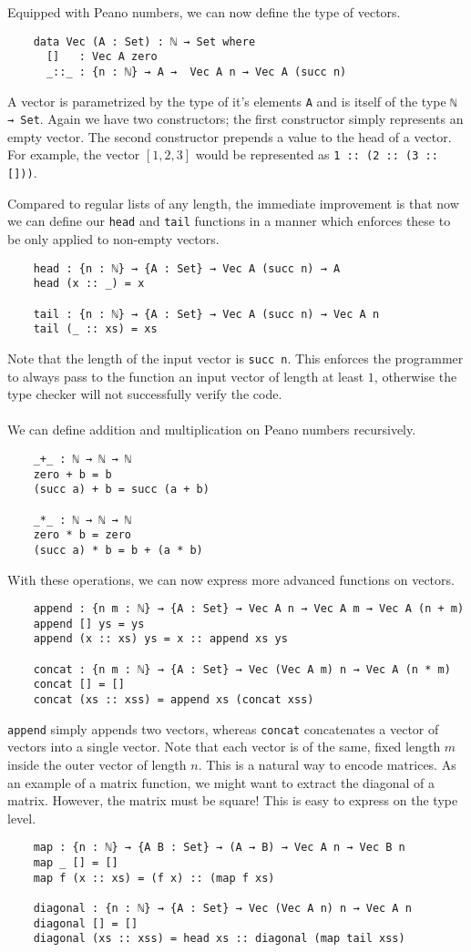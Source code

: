 \documentclass[12pt]{article}
\begin{document}
Equipped with Peano numbers, we can now define the type of vectors.
\begin{verbatim}
    data Vec (A : Set) : ℕ → Set where
      []   : Vec A zero
      _::_ : {n : ℕ} → A →  Vec A n → Vec A (succ n)
\end{verbatim}
A vector is parametrized by the type of it's elements \verb|A| and is itself of the type \verb|ℕ → Set|. Again we have two constructors; the first constructor simply represents an empty vector. The second constructor prepends a value to the head of a vector. For example, the vector $[1, 2, 3]$ would be represented as \verb|1 :: (2 :: (3 :: []))|.

Compared to regular lists of any length, the immediate improvement is that now we can define our \verb|head| and \verb|tail| functions in a manner which enforces these to be only applied to non-empty vectors.
\begin{verbatim}
    head : {n : ℕ} → {A : Set} → Vec A (succ n) → A
    head (x :: _) = x

    tail : {n : ℕ} → {A : Set} → Vec A (succ n) → Vec A n
    tail (_ :: xs) = xs
\end{verbatim}
Note that the length of the input vector is \verb|succ n|. This enforces the programmer to always pass to the function an input vector of length at least $1$, otherwise the type checker will not successfully verify the code.

\paragraph{}
We can define addition and multiplication on Peano numbers recursively.
\begin{verbatim}
    _+_ : ℕ → ℕ → ℕ
    zero + b = b
    (succ a) + b = succ (a + b)

    _*_ : ℕ → ℕ → ℕ
    zero * b = zero
    (succ a) * b = b + (a * b)
\end{verbatim}
With these operations, we can now express more advanced functions on vectors.
\begin{verbatim}
    append : {n m : ℕ} → {A : Set} → Vec A n → Vec A m → Vec A (n + m)
    append [] ys = ys
    append (x :: xs) ys = x :: append xs ys

    concat : {n m : ℕ} → {A : Set} → Vec (Vec A m) n → Vec A (n * m)
    concat [] = []
    concat (xs :: xss) = append xs (concat xss)
\end{verbatim}
\verb|append| simply appends two vectors, whereas \verb|concat| concatenates a vector of vectors into a single vector. Note that each vector is of the same, fixed length $m$ inside the outer vector of length $n$. This is a natural way to encode matrices. As an example of a matrix function, we might want to extract the diagonal of a matrix. However, the matrix must be square! This is easy to express on the type level.
\begin{verbatim}
    map : {n : ℕ} → {A B : Set} → (A → B) → Vec A n → Vec B n
    map _ [] = []
    map f (x :: xs) = (f x) :: (map f xs)

    diagonal : {n : ℕ} → {A : Set} → Vec (Vec A n) n → Vec A n
    diagonal [] = []
    diagonal (xs :: xss) = head xs :: diagonal (map tail xss)
\end{verbatim}
\end{document}
